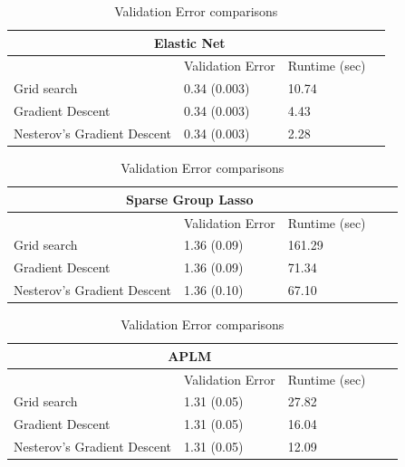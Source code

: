 \documentclass[10pt,letterpaper]{article}
\begin{document}
\begin{table} 
\begin{center}

\begin{tabular}{| l | l | l | l | }
\hline
\multicolumn{3}{|c|}{Elastic Net}\\
\hline
 & Validation Error & Runtime (sec) \\
\hline
Grid search & 0.34 (0.003) & 10.74\\
\hline
Gradient Descent & 0.34 (0.003) & 4.43 \\
\hline
Nesterov's Gradient Descent & 0.34 (0.003) & 2.28 \\
\hline
\end{tabular}


\begin{tabular}{| l | l | l | l | l | }
\hline
\multicolumn{3}{|c|}{Sparse Group Lasso}\\
\hline
 & Validation Error & Runtime (sec) \\
\hline
Grid search & 1.36 (0.09) & 161.29 \\
\hline
Gradient Descent  & 1.36 (0.09) & 71.34 \\
\hline
Nesterov's Gradient Descent  & 1.36 (0.10) & 67.10 \\
\hline
\end{tabular}

\begin{tabular}{| l | l | l | l | l | }
\hline
\multicolumn{3}{|c|}{APLM}\\
\hline
 & Validation Error & Runtime (sec) \\
\hline
Grid search  & 1.31 (0.05) & 27.82 \\
\hline
Gradient Descent  & 1.31 (0.05) & 16.04 \\
\hline
Nesterov's Gradient Descent  & 1.31 (0.05) & 12.09 \\
\hline
\end{tabular}

\end{center}
\caption {Validation Error comparisons}
\label{table:validation}
\end{table}
\end{document}
